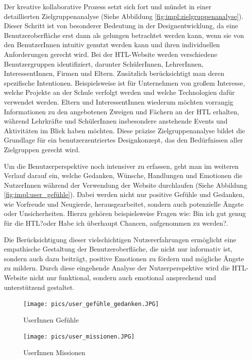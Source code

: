 Der kreative kollaborative Prozess setzt sich fort und mündet in einer detaillierten Zielgruppenanalyse (Siehe Abbildung \ref{fig:impl:zielgruppenanalyse}). 
Dieser Schritt ist von besonderer Bedeutung in der Designentwicklung, da eine Benutzeroberfläche erst dann als gelungen betrachtet werden kann, 
wenn sie von den BenutzerInnen intuitiv genutzt werden kann und ihren individuellen Anforderungen gerecht wird. 
Bei der HTL-Website werden verschiedene Benutzergruppen identifiziert, darunter SchülerInnen, LehrerInnen, InteressentInnen, Firmen und Eltern. 
Zusätzlich berücksichtigt man deren spezifische Intentionen. Beispielsweise ist für Unternehmen von großem Interesse, 
welche Projekte an der Schule verfolgt werden und welche Technologien dafür verwendet werden. 
Eltern und InteressentInnen wiederum möchten vorrangig Informationen zu den angebotenen Zweigen und Fächern an der HTL erhalten, 
während Lehrkräfte und SchülerInnen insbesondere anstehende Events und Aktivitäten im Blick haben möchten. 
Diese präzise Zielgruppenanalyse bildet die Grundlage für ein benutzerzentriertes Designkonzept, das den Bedürfnissen aller Zielgruppen gerecht wird.


Um die Benutzerperspektive noch intensiver zu erfassen, geht man im weiteren Verlauf darauf ein, 
welche Gedanken, Wünsche, Handlungen und Emotionen die NutzerInnen während der Verwendung der Website durchlaufen (Siehe Abbildung \ref{fig:impl:user_gefühle}). 
Dabei werden nicht nur positive Gefühle und Gedanken, wie Vorfreude und Neugierde, herausgearbeitet, sondern auch potenzielle Ängste oder Unsicherheiten. 
Hierzu gehören beispielsweise Fragen wie: \glqq Bin ich gut genug für die HTL?\grqq oder \grqq Habe ich überhaupt Chancen, aufgenommen zu werden?\grqq.

Die Berücksichtigung dieser vielschichtigen Nutzererfahrungen ermöglicht eine empathische Gestaltung der Benutzeroberfläche, 
die nicht nur informativ ist, sondern auch dazu beiträgt, positive Emotionen zu fördern und mögliche Ängste zu mildern. 
Durch diese eingehende Analyse der Nutzerperspektive wird die HTL-Website nicht nur funktional, sondern auch emotional ansprechend und unterstützend gestaltet.

\begin{figure}
   \begin{minipage}[b]{.4\linewidth} 
      \texttt{[image: pics/user\_gefühle\_gedanken.JPG]}
      \caption{UserInnen Gefühle}
      \label{fig:impl:user_gefühle}
   \end{minipage}
   \hspace{.05\linewidth}
   \begin{minipage}[b]{.4\linewidth}
      \texttt{[image: pics/user\_missionen.JPG]}
      \caption{UserInnen Missionen}
      \label{fig:impl:user:missionen}
   \end{minipage}
\end{figure}


